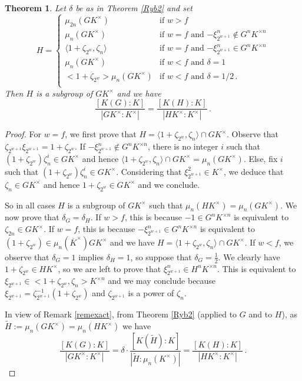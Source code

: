 \documentclass[11pt, a4paper]{amsart}
\newtheorem {thm}{Theorem}
\theoremstyle{definition}
\begin{document}
\begin{thm}\label{better2}
Let $\delta$ be as in Theorem \ref{Ryb2} and set
$$H=\begin{cases} \mu_{2n}(GK^\times) & \text{if $w>f$}\\
\mu_{n}(GK^\times) & \text{if $w=f$ and $-\xi_{2^{w+1}}^n\notin G^nK^{\times n}$}\\
\langle 1+\zeta_{2^w}, \zeta_n\rangle & \text{if $w=f$ and $-\xi_{2^{w+1}}^n\in G^nK^{\times n}$}\\
\mu_{n}(GK^\times) & \text{if $w<f$ and $\delta=1$}\\
<1+\zeta_{2^w}>\mu_{n}(GK^\times)& \text{if $w<f$ and $\delta=1/2$}\,.\\
\end{cases}$$
Then $H$ is a subgroup of $GK^\times$ and we have
$$\frac{[K(G):K]}
{|GK^{\times}:K^{\times}|}= \frac{[K(H):K]}
{|HK^{\times}:K^{\times}|}\,.$$
\end{thm}
\begin{proof}
For $w=f$, we first prove that $H=\langle 1+\zeta_{2^w}, \zeta_n\rangle \cap GK^\times$. Observe that $\zeta_{2^{w+1}}\xi_{2^{w+1}}=1+\zeta_{2^w}$. If $-\xi_{2^{w+1}}^n\notin G^nK^{\times n}$, there is no integer $i$ such that $(1+\zeta_{2^w})\zeta_n^i\in GK^\times$ and hence $\langle 1+\zeta_{2^w}, \zeta_n\rangle \cap GK^\times=\mu_n(GK^\times)$. Else, fix $i$ such that $(1+\zeta_{2^w})\zeta_n^i\in GK^\times$. Considering that $\xi_{2^{w+1}}^2\in K^\times$, we deduce that $\zeta_n\in GK^\times$ and hence $1+\zeta_{2^w}\in GK^\times$ and we conclude.

So in all cases $H$ is a subgroup of $GK^\times$ such that $\mu_n(HK^\times)=\mu_n(GK^\times)$. We now prove that $\delta_G=\delta_{H}$.
If $w>f$, this is because $-1\in G^nK^{\times n}$ is equivalent to $\zeta_{2n}\in GK^{\times}$.
If $w=f$, this is because $-\xi_{2^{w+1}}^n\in G^nK^{\times n}$ is equivalent to $(1+\zeta_{2^w})\in \mu_n(\overline{K}^\times) GK^{\times}$ and we have $H=\langle 1+\zeta_{2^w}, \zeta_n\rangle \cap GK^\times$. If $w<f$, we observe that $\delta_G=1$ implies $\delta_{H}=1$, so suppose that $\delta_G=\frac{1}{2}$. We clearly have $1+\zeta_{2^w}\in HK^{\times}$, so we are left to prove that $\xi_{2^{w+1}}^n\in H^nK^{\times n}$. This is equivalent to $\xi_{2^{w+1}}\in <1+\zeta_{2^w},\zeta_n>K^{\times n}$ and we may conclude because $\xi_{2^{w+1}}=\zeta_{2^{w+1}}^{-1}(1+\zeta_{2^w})$ and $\zeta_{2^{w+1}}$ is a power of $\zeta_{n}$.

In view of Remark \ref{remexact}, from Theorem \ref{Ryb2} (applied to $G$ and to $H$), as $\tilde{H}:=\mu_n(GK^\times)=\mu_n(HK^\times)$ we have 
$$\frac{[K(G):K]}
{|GK^{\times}:K^{\times}|}=\delta \cdot \frac{[K(\tilde{H}):K]}{|\tilde{H}:\mu_n(K^{\times})|}=\frac{[K(H):K]}
{|HK^{\times}:K^{\times}|}\,.$$
\end{proof}
\end{document}
